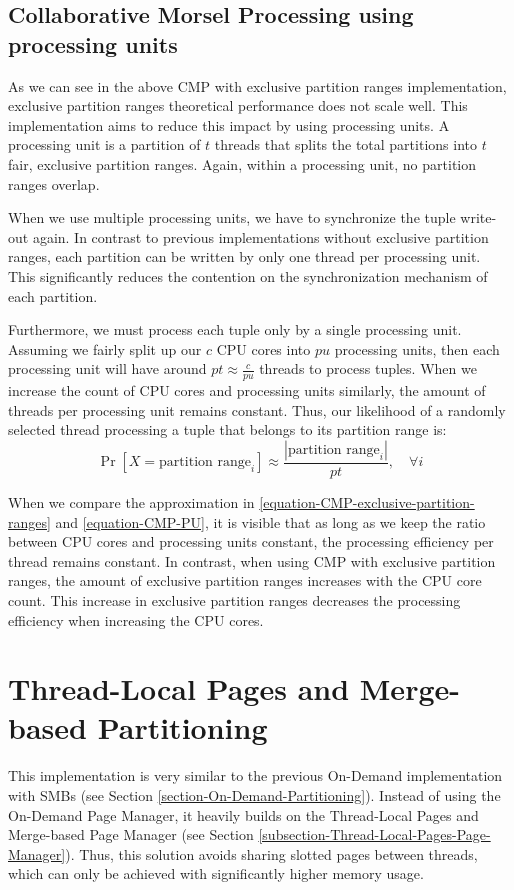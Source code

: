 \subsection{Collaborative Morsel Processing using processing units}
As we can see in the above \ac{CMP} with exclusive partition ranges implementation, exclusive partition ranges theoretical performance does not scale well.
This implementation aims to reduce this impact by using processing units.
A processing unit is a partition of $t$ threads that splits the total partitions into $t$ fair, exclusive partition ranges.
Again, within a processing unit, no partition ranges overlap.

When we use multiple processing units, we have to synchronize the tuple write-out again.
In contrast to previous implementations without exclusive partition ranges, each partition can be written by only one thread per processing unit.
This significantly reduces the contention on the synchronization mechanism of each partition.

Furthermore, we must process each tuple only by a single processing unit.
Assuming we fairly split up our $c$ \ac{CPU} cores into $pu$ processing units, then each processing unit will have around $pt\approx\frac{c}{pu}$ threads to process tuples.
When we increase the count of CPU cores and processing units similarly, the amount of threads per processing unit remains constant.
Thus, our likelihood of a randomly selected thread processing a tuple that belongs to its partition range is:
\begin{equation}\label{equation-CMP-PU}
  \Pr[X=\textrm{partition range}_i] \approx \frac{|\textrm{partition range}_i|}{pt},  \quad \forall i
\end{equation}

When we compare the approximation in \ref{equation-CMP-exclusive-partition-ranges} and \ref{equation-CMP-PU}, it is visible that as long as we keep the ratio between CPU cores and processing units constant, the processing efficiency per thread remains constant.
In contrast, when using \acl{CMP} with exclusive partition ranges, the amount of exclusive partition ranges increases with the CPU core count.
This increase in exclusive partition ranges decreases the processing efficiency when increasing the CPU cores.

\section{Thread-Local Pages and Merge-based Partitioning}
This implementation is very similar to the previous On-Demand implementation with \aclp{SMB} (see Section \ref{section-On-Demand-Partitioning}).
Instead of using the On-Demand Page Manager, it heavily builds on the Thread-Local Pages and Merge-based Page Manager (see Section \ref{subsection-Thread-Local-Pages-Page-Manager}).
Thus, this solution avoids sharing slotted pages between threads, which can only be achieved with significantly higher memory usage.

